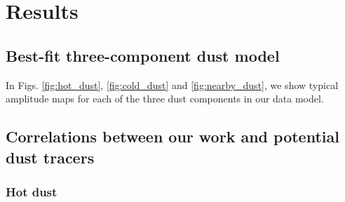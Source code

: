 \documentclass{aa}
\begin{document}
\clearpage
\section{Results}

\subsection{Best-fit three-component dust model}
In Figs. \ref{fig:hot_dust}, \ref{fig:cold_dust} and \ref{fig:nearby_dust}, we show typical amplitude maps for each of the three dust components in our data model.


\subsection{Correlations between our work and potential dust tracers}
\subsubsection{Hot dust}
\end{document}
